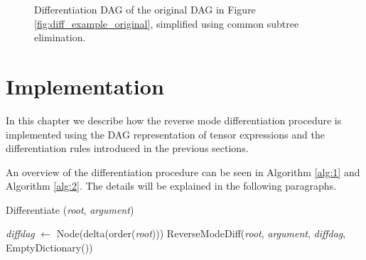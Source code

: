 \documentclass[12pt, a4paper]{report}
\begin{document}
\begin{figure}
    \centering
    \caption{Differentiation DAG of the original DAG in Figure \ref{fig:diff_example_original}, simplified using common subtree elimination.}
    \label{fig:diff_example_final}
\end{figure}

\FloatBarrier
\section{Implementation}
In this chapter we describe how the reverse mode differentiation procedure is implemented using the DAG representation of tensor expressions and the differentiation rules introduced in the previous sections.

An overview of the differentiation procedure can be seen in Algorithm \ref{alg:1} and Algorithm \ref{alg:2}.
The details will be explained in the following paragraphs.

\begin{algorithm}
    \caption{Differentiate (\textit{root}, \textit{argument})}\label{alg:1}
    \begin{algorithmic}
        \State \textit{diffdag} $\gets$ Node(delta(order(\textit{root})))
        \State ReverseModeDiff(\textit{root}, \textit{argument}, \textit{diffdag}, EmptyDictionary())
    \end{algorithmic}
\end{algorithm}
\end{document}
